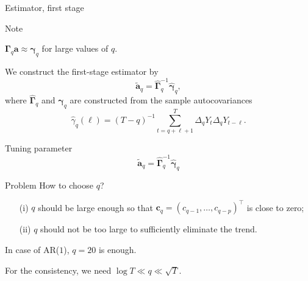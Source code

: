\documentclass[10pt, handout]{beamer}
\begin{document}
\begin{frame}{Estimator, first stage}

\begin{block}{Note}
\vspace{-3mm}
\begin{center}
$\boldsymbol{\Gamma}_q \boldsymbol{a} \approx \boldsymbol{\gamma}_q$ for large values of $q$.
\vspace{-3mm}
\end{center}\end{block}\pause

We construct the first-stage estimator by
\begin{equation*}
\widetilde{\boldsymbol{a}}_q = \widehat{\boldsymbol{\Gamma}}_q^{-1} \widehat{\boldsymbol{\gamma}}_q, 
\end{equation*}
where $\widehat{\boldsymbol{\Gamma}}_q$ and $\widehat{\boldsymbol{\gamma}}_q$ are constructed from the sample autocovariances $$\widehat{\gamma}_q(\ell) = (T-q)^{-1} \sum_{t=q+\ell+1}^T \Delta_q Y_{t} \Delta_q Y_{t-\ell}.$$ 
\end{frame}

\begin{frame}{Tuning parameter}
\begin{equation*}
\widetilde{\boldsymbol{a}}_q = \widehat{\boldsymbol{\Gamma}}_q^{-1} \widehat{\boldsymbol{\gamma}}_q 
\end{equation*}
\vspace{-3mm}
\begin{block}{Problem}
How to choose $q$?
\end{block}\pause
\vspace{-2mm}
\begin{itemize}
	\item[(i)] $q$ should be large enough so that $\boldsymbol{c}_q = (c_{q-1},\dots,c_{q-p})^\top$ is close to zero;\pause
	\item[(ii)] $q$ should not be too large to sufficiently eliminate the trend.
\end{itemize}\pause
In case of AR($1$), $q= 20$ is enough.\pause

For the consistency, we need $\log T \ll q \ll \sqrt{T}$.
\end{frame}
\end{document}
